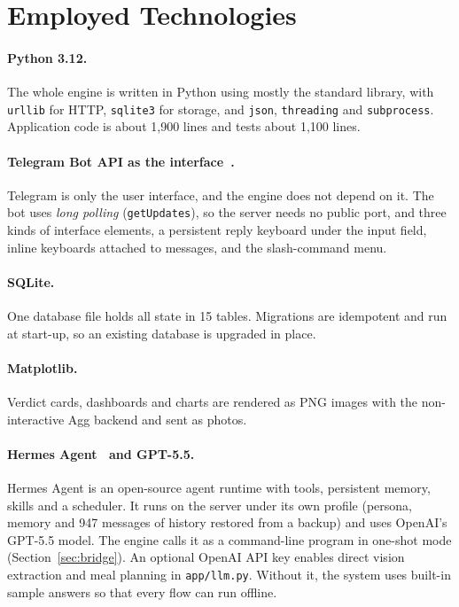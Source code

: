 \documentclass[11pt,a4paper]{article}
\begin{document}
\section{Employed Technologies}\label{sec:tech}

\paragraph{Python 3.12.} The whole engine is written in Python using mostly the standard library, with
\texttt{urllib} for HTTP, \texttt{sqlite3} for storage, and \texttt{json}, \texttt{threading} and
\texttt{subprocess}. Application code is about 1{,}900 lines and tests about 1{,}100 lines.

\paragraph{Telegram Bot API as the interface~\cite{telegrambotapi}.} Telegram is only the user
interface, and the engine does not depend on it. The bot uses \emph{long polling}
(\texttt{getUpdates}), so the server needs no public port, and three kinds of interface elements, a
persistent reply keyboard under the input field, inline keyboards attached to messages, and the
slash-command menu.

\paragraph{SQLite.} One database file holds all state in 15 tables. Migrations are idempotent and run
at start-up, so an existing database is upgraded in place.

\paragraph{Matplotlib.} Verdict cards, dashboards and charts are rendered as PNG images with the
non-interactive Agg backend and sent as photos.

\paragraph{Hermes Agent~\cite{hermesagent} and GPT-5.5.} Hermes Agent is an open-source agent runtime
with tools, persistent memory, skills and a scheduler. It runs on the server under its own profile
(persona, memory and 947 messages of history restored from a backup) and uses OpenAI's GPT-5.5 model.
The engine calls it as a command-line program in one-shot mode (Section~\ref{sec:bridge}). An optional
OpenAI API key enables direct vision extraction and meal planning in \texttt{app/llm.py}. Without it,
the system uses built-in sample answers so that every flow can run offline.
\end{document}

